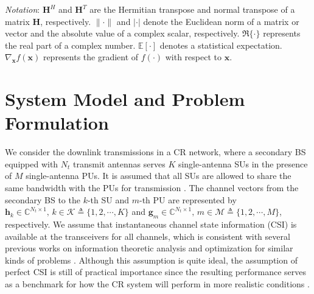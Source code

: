 \documentclass[english]{IEEEtran}
\theoremstyle{plain}
\theoremstyle{remark}
\begin{document}
\emph{Notation}: $\mathbf{H}^{H}$ and $\mathbf{H}^{T}$ are the Hermitian transpose and normal transpose of a matrix $\mathbf{H}$, respectively. $\|\cdot\|$ and $|\cdot|$ denote the Euclidean norm of a matrix or vector and the absolute value of a complex scalar, respectively.   $\Re\{\cdot\}$ represents the real part of a complex number. $\mathbb{E}[\cdot]$ denotes a statistical expectation. $\nabla_{\mathbf{x}}f(\mathbf{x})$ represents the gradient of  $f(\cdot)$ with respect to  $\mathbf{x}$. 
\vspace*{-0.4cm}
\section{System Model and Problem Formulation}\label{Systemmodel}\vspace*{-0.08cm}
We consider the downlink transmissions in a CR network, where a secondary BS equipped with $N_t$ transmit antennas  serves $K$ single-antenna SUs in the presence of $M$ single-antenna PUs.  It is assumed that all SUs are allowed to share the same bandwidth with the PUs for transmission \cite{ZhangTSP08,NguyenTVT16}. The channel vectors from the secondary BS to the $k$-th SU and $m$-th PU are represented by $\mathbf{h}_{k}\in\mathbb{C}^{N_t\times 1},\, k\in\mathcal{K}\triangleq\{1,2,\cdots, K\}$ and $\mathbf{g}_{m}\in\mathbb{C}^{N_t\times 1},\, m\in\mathcal{M}\triangleq\{1,2,\cdots, M\}$, respectively. We assume that  instantaneous channel state information (CSI)  is available at the transceivers for all channels, which is consistent with several
previous works on information theoretic analysis and optimization for  similar kinds of problems \cite{Zhang08,HeTWC14,Zhang09,ZhangTSP08,NguyenTVT16}. Although this assumption is quite ideal,  the assumption of perfect CSI is still of practical importance since the resulting performance serves  as a benchmark for how the CR system will perform in more realistic conditions \cite{NguyenCL16}.
\end{document}
